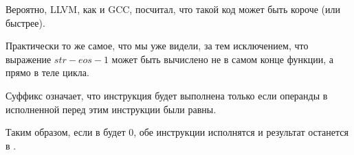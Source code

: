 Вероятно, LLVM, как и GCC, посчитал, что такой код может быть короче (или быстрее).

\myparagraphold{\OptimizingKeilVI (\ARMMode)}



Практически то же самое, что мы уже видели, за тем исключением, что выражение $str - eos - 1$ 
может быть вычислено не в самом конце функции, а прямо в теле цикла.

Суффикс  означает, что инструкция будет выполнена только
если операнды в исполненной перед этим инструкции \CMP были равны.

Таким образом, если в  будет 0,
обе инструкции  исполнятся и результат останется в .

